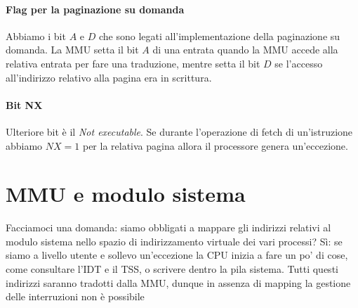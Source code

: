 \documentclass[11pt]{report}
\theoremstyle{definition}
\begin{document}
\paragraph{Flag per la paginazione su domanda} Abbiamo i bit $A$ e $D$ che sono legati all'implementazione della paginazione su domanda. La MMU setta il bit $A$ di una entrata quando la MMU accede alla relativa entrata per fare una traduzione, mentre setta il bit $D$ se l'accesso all'indirizzo relativo alla pagina era in scrittura.
\paragraph{Bit NX} Ulteriore bit è il \emph{Not executable}. Se durante l'operazione di fetch di un'istruzione abbiamo $NX=1$ per la relativa pagina allora il processore genera un'eccezione.







\section{MMU e modulo sistema} 
Facciamoci una domanda: siamo obbligati a mappare gli indirizzi relativi al modulo sistema nello spazio di indirizzamento virtuale dei vari processi? Sì: se siamo a livello utente e sollevo un'eccezione la CPU inizia a fare un po' di cose, come consultare l'IDT e il TSS, o scrivere dentro la pila sistema. Tutti questi indirizzi saranno tradotti dalla MMU, dunque in assenza di mapping la gestione delle interruzioni non è possibile
\end{document}
